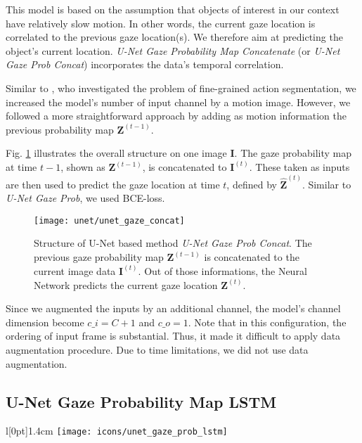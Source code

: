 This model is based on the assumption that objects of interest in our context have relatively slow motion. In other words, the current gaze location is correlated to the previous gaze location(s). We therefore aim at predicting the object's current location. \textit{U-Net Gaze Probability Map Concatenate} (or \textit{U-Net Gaze Prob Concat}) incorporates the data's temporal correlation.

\endgroup

Similar to \cite{lea16}, who investigated the problem of fine-grained action segmentation, we increased the model's number of input channel by a motion image. However, we followed a more straightforward approach by adding as motion information the previous probability map $\boldsymbol{Z}^{(t-1)}$.

Fig. \ref{fig:unet_gaze_concat} illustrates the overall structure on one image $\boldsymbol{I}$. The gaze probability map at time $t-1$, shown as $\boldsymbol{Z}^{(t-1)}$, is concatenated to $\boldsymbol{I}^{(t)}$. These taken as inputs are then used to predict the gaze location at time $t$, defined by $\boldsymbol{\hat{Z}}^{(t)}$. Similar to \textit{U-Net Gaze Prob}, we used BCE-loss.

\begin{figure}[htbp]
  \centering
  \texttt{[image: unet/unet\_gaze\_concat]}
  \caption[Structure of U-Net Gaze Prob Concat]{Structure of U-Net based method \textit{U-Net Gaze Prob Concat}. The previous gaze probability map $\boldsymbol{Z}^{(t-1)}$ is concatenated to the current image data $\boldsymbol{I}^{(t)}$. Out of those informations, the Neural Network predicts the current gaze location $\boldsymbol{Z}^{(t)}$.}
  \label{fig:unet_gaze_concat}
\end{figure}

Since we augmented the inputs by an additional channel, the model's channel dimension become $c\_i=C+1$ and $c\_o=1$. Note that in this configuration, the ordering of input frame is substantial. Thus, it made it difficult to apply data augmentation procedure. Due to time limitations, we did not use data augmentation.

\subsection{U-Net Gaze Probability Map LSTM} \label{ch:unet_gaze_prob_lstm}
\begingroup
\setlength\intextsep{0pt}
\begin{wrapfigure}[4]{l}[0pt]{1.4cm}
\texttt{[image: icons/unet\_gaze\_prob\_lstm]}
\end{wrapfigure}

